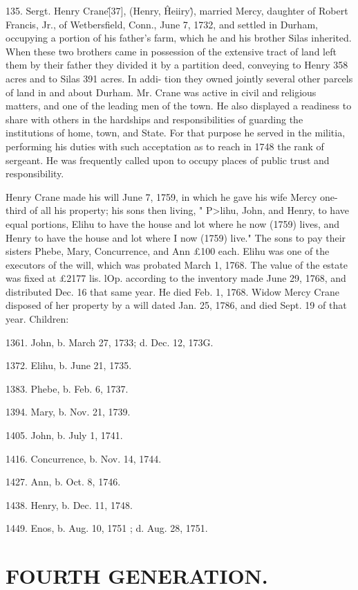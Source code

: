 135. Sergt. Henry Crane\^ [37], (Henry, \^ Heiiry\^), married 
Mercy, daughter of Robert Francis, Jr., of Wetbersfield, Conn., 
June 7, 1732, and settled in Durham, occupying a portion of his 
father's farm, which he and his brother Silas inherited. When 
these two brothers came in possession of the extensive tract of 
land left them by their father they divided it by a partition deed, 
conveying to Henry 358 acres and to Silas 391 acres. In addi- 
tion they owned jointly several other parcels of land in and about 
Durham. Mr. Crane was active in civil and religious matters, 
and one of the leading men of the town. He also displayed a 
readiness to share with others in the hardships and responsibilities 
of guarding the institutions of home, town, and State. For that 
purpose he served in the militia, performing his duties with such 
acceptation as to reach in 1748 the rank of sergeant. He was 
frequently called upon to occupy places of public trust and 
responsibility. 

Henry Crane made his will June 7, 1759, in which he gave his 
wife Mercy one-third of all his property; his sons then living, 
" P>lihu, John, and Henry, to have equal portions, Elihu to have 
the house and lot where he now (1759) lives, and Henry to have 
the house and lot where I now (1759) live." The sons to pay 
their sisters Phebe, Mary, Concurrence, and Ann £100 each. 
Elihu was one of the executors of the will, which was probated 
March 1, 1768. The value of the estate was fixed at £2177  
lis.  lOp. according to the inventory made June 29, 1768, and 
distributed Dec. 16 that same year. He died Feb. 1, 1768. 
Widow Mercy Crane disposed of her property by a will dated 
Jan. 25, 1786, and died Sept. 19 of that year. Children: 

1361. John, b. March 27, 1733; d. Dec. 12, 173G. 

1372. Elihu, b. June 21, 1735. 

1383. Phebe, b. Feb. 6, 1737. 

1394. Mary, b. Nov. 21, 1739. 

1405. John, b. July 1, 1741. 

1416. Concurrence, b. Nov. 14, 1744. 

1427. Ann, b. Oct. 8, 1746. 

1438. Henry, b. Dec. 11, 1748. 

1449. Enos, b. Aug. 10, 1751 ; d. Aug. 28, 1751. 



\section{FOURTH GENERATION.}


